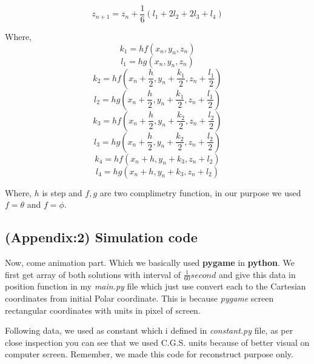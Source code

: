 \documentclass[11pt,a4paper]{article}
\begin{document}
\begin{equation*}
z_{n+1} = z_{n}+\frac{1}{6}(l_{1}+2l_{2}+2l_{3}+l_{4})
\end{equation*}

Where,
\begin{equation*}
k_{1}=hf(x_{n},y_{n},z_{n})
\end{equation*}
\begin{equation*}
l_{1}=hg(x_{n},y_{n},z_{n})
\end{equation*}
\begin{equation*}
k_{2}=hf(x_{n}+\frac{h}{2},y_{n}+\frac{k_{1}}{2},z_{n}+\frac{l_{1}}{2})
\end{equation*}
\begin{equation*}
l_{2}=hg(x_{n}+\frac{h}{2},y_{n}+\frac{k_{1}}{2},z_{n}+\frac{l_{1}}{2})
\end{equation*}
\begin{equation*}
k_{3}=hf(x_{n}+\frac{h}{2},y_{n}+\frac{k_{2}}{2},z_{n}+\frac{l_{2}}{2})
\end{equation*}
\begin{equation*}
l_{3}=hg(x_{n}+\frac{h}{2},y_{n}+\frac{k_{2}}{2},z_{n}+\frac{l_{2}}{2})
\end{equation*}
\begin{equation*}
k_{4}=hf(x_{n}+h,y_{n}+k_{3},z_{n}+l_{2})
\end{equation*}
\begin{equation*}
l_{4}=hg(x_{n}+h,y_{n}+k_{3},z_{n}+l_{2})
\end{equation*}

Where, \(h\) is step and \(f,g\) are two complimetry function, in our purpose we used \(f = \theta\) and \(f = \phi\).





\subsection{(Appendix:2) Simulation code}
\label{sec:org92485d5}

Now, come animation part. Which we basically used \textbf{pygame} in \textbf{python}. We first get array of both solutions with interval of \(\frac{1}{60} second\) and give this data in position function in my \emph{main.py} file which just use convert each to the Cartesian coordinates from initial Polar coordinate. This is because \emph{pygame} screen rectangular coordinates with units in pixel of screen.

Following data, we used as constant which i defined in \emph{constant.py} file, as per close inspection you can see that we used C.G.S. units because of better visual on computer screen. Remember, we made this code for reconstruct purpose only.
\end{document}
